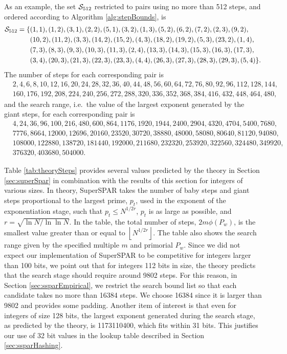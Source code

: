 \documentclass{ucalgthes1}
\theoremstyle{definition}
\newcommand{\floor}[1]{\left\lfloor #1 \right\rfloor}
\begin{document}
As an example, the set $\mathcal S_{512}$ restricted to pairs using no more than 512 steps, and ordered according to Algorithm \ref{alg:stepBounds}, is
\begin{align*}
\mathcal S_{512} = \{&(1,1),(1,2),(3,1),(2,2),(5,1),(3,2),(1,3),(5,2),(6,2),(7,2),(2,3),(9,2), \\
&(10,2),(11,2),(3,3),(14,2),(15,2),(4,3),(18,2),(19,2),(5,3),(23,2),(1,4), \\
&(7,3),(8,3),(9,3),(10,3),(11,3),(2,4),(13,3),(14,3),(15,3),(16,3),(17,3), \\
&(3,4),(20,3),(21,3),(22,3),(23,3),(4,4),(26,3),(27,3),(28,3),(29,3),(5,4)\}.
\end{align*}
The number of steps for each corresponding pair is
\begin{align*}
&2,4,6,8,10,12,16,20,24,28,32,36,40,44,48,56,60,64,72,76,80,92,96,112,128,144,\\
&160,176,192,208,224,240,256,272,288,320,336,352,368,384,416,432,448,464,480,
\end{align*}
and the search range, i.e.\ the value of the largest exponent generated by the giant steps, for each corresponding pair is
\begin{align*}
&4,24,36,96,100,216,480,600,864,1176,1920,1944,2400,2904,4320,4704,5400,7680,\\
&7776,8664,12000,12696,20160,23520,30720,38880,48000,58080,80640,81120,94080,\\
&108000,122880,138720,181440,192000,211680,232320,253920,322560,324480,349920,\\
&376320,403680,504000.
\end{align*}

Table \ref{tab:theorySteps} provides several values predicted by the theory in Section \ref{sec:superSpar} in combination with the results of this section for integers of various sizes.  In theory, SuperSPAR takes the number of baby steps and giant steps proportional to the largest prime, $p_t$, used in the exponent of the exponentiation stage, such that $p_t \le N^{1/2r}$, $p_t$ is as large as possible, and $r = \sqrt{\ln N / \ln \ln N}$.  In the table, the total number of steps, $2m\phi(P_w)$, is the smallest value greater than or equal to $\floor{N^{1/2r}}$.  The table also shows the search range given by the specified multiple $m$ and primorial $P_w$.  Since we did not expect our implementation of SuperSPAR to be competitive for integers larger than 100 bits, we point out that for integers 112 bits in size, the theory predicts that the search stage should require around 9802 steps.  For this reason, in Section \ref{sec:ssparEmpirical}, we restrict the search bound list so that each candidate takes no more than 16384 steps.  We choose 16384 since it is larger than 9802 and provides some padding.  Another item of interest is that even for integers of size 128 bits, the largest exponent generated during the search stage, as predicted by the theory, is 1173110400, which fits within 31 bits.  This justifies our use of 32 bit values in the lookup table described in Section \ref{sec:ssparHashing}.
\end{document}
